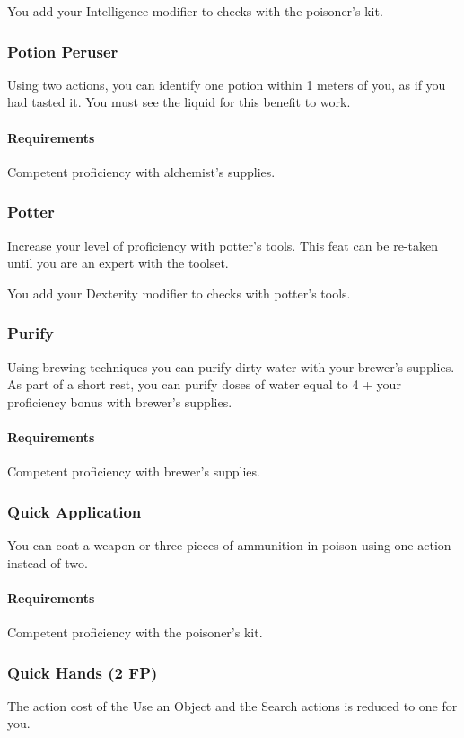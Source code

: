     You add your Intelligence modifier to checks with the poisoner's kit.
\subsubsection{Potion Peruser} \label{feat::potionperuser}
    Using two actions, you can identify one potion within 1 meters of you, as if you had tasted it.
    You must see the liquid for this benefit to work.
    \paragraph{Requirements} Competent proficiency with alchemist's supplies.
\subsubsection{Potter} \label{feat::potter}
    Increase your level of proficiency with potter's tools.
    This feat can be re-taken until you are an expert with the toolset.

    You add your Dexterity modifier to checks with potter's tools.
\subsubsection{Purify} \label{feat::purify}
    Using brewing techniques you can purify dirty water with your brewer's supplies.
    As part of a short rest, you can purify doses of water equal to 4 + your proficiency bonus with brewer's supplies.
    \paragraph{Requirements} Competent proficiency with brewer's supplies.
\subsubsection{Quick Application} \label{feat::quickapplication}
    You can coat a weapon or three pieces of ammunition in poison using one action instead of two.
    \paragraph{Requirements} Competent proficiency with the poisoner's kit.
\subsubsection{Quick Hands (2 FP)} \label{feat::quickhands}
    The action cost of the Use an Object and the Search actions is reduced to one for you.
